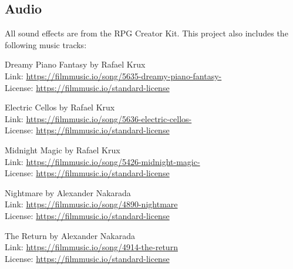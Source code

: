 \documentclass[10pt]{article}
\begin{document}



\subsection{Audio}

All sound effects are from the RPG Creator Kit. This project also includes the following music tracks:

Dreamy Piano Fantasy  by Rafael Krux\\
Link: \url{https://filmmusic.io/song/5635-dreamy-piano-fantasy-}\\
License: \url{https://filmmusic.io/standard-license}

Electric Cellos  by Rafael Krux\\
Link: \url{https://filmmusic.io/song/5636-electric-cellos-}\\
License: \url{https://filmmusic.io/standard-license}

Midnight Magic  by Rafael Krux\\
Link: \url{https://filmmusic.io/song/5426-midnight-magic-}\\
License: \url{https://filmmusic.io/standard-license}

Nightmare by Alexander Nakarada\\
Link: \url{https://filmmusic.io/song/4890-nightmare}\\
License: \url{https://filmmusic.io/standard-license}

The Return by Alexander Nakarada\\
Link: \url{https://filmmusic.io/song/4914-the-return}\\
License: \url{https://filmmusic.io/standard-license}

\end{document}
